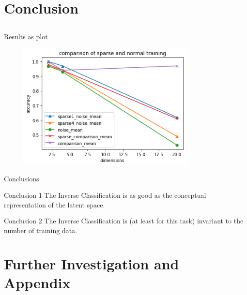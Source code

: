 \documentclass[compress]{beamer}
\begin{document}
	\section{Conclusion}
	\subsection{ } %
	\begin{frame}{Results as plot}
		\begin{figure}
			\centering
			\includegraphics[width=0.8\textwidth]{images/result_plot.png}
		\end{figure}
	\end{frame}
	\begin{frame}{Conclusions}
	\begin{block}{Conclusion 1}
		The Inverse Classification is as good as the conceptual representation of the latent space.
	\end{block}
	\hspace{2cm}
	\begin{block}{Conclusion 2}
		The Inverse Classification is (at least for this task) invariant to the number of training data.
	\end{block}
	\end{frame}
	\section{Further Investigation and Appendix}
\end{document}
